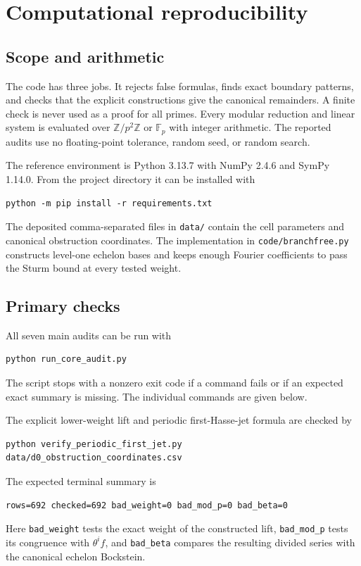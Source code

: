 \section{Computational reproducibility}
\label{app:computational-reproducibility}

\subsection{Scope and arithmetic}

The code has three jobs.  It rejects false formulas, finds exact boundary
patterns, and checks that the explicit constructions give the canonical
remainders.  A finite check is never used as a proof for all primes.  Every
modular reduction and linear system is evaluated over
$\mathbb Z/p^2\mathbb Z$ or $\mathbb F_p$ with integer arithmetic.  The
reported audits use no floating-point tolerance, random seed, or random
search.

The reference environment is Python 3.13.7 with NumPy 2.4.6 and SymPy
1.14.0.  From the project directory it can be installed with
\begin{verbatim}
python -m pip install -r requirements.txt
\end{verbatim}
The deposited comma-separated files in \texttt{data/} contain the cell
parameters and canonical obstruction coordinates.  The implementation in
\texttt{code/branchfree.py} constructs level-one echelon bases and keeps
enough Fourier coefficients to pass the Sturm bound at every tested weight.

\subsection{Primary checks}

All seven main audits can be run with
\begin{verbatim}
python run_core_audit.py
\end{verbatim}
The script stops with a nonzero exit code if a command fails or if an
expected exact summary is missing.  The individual commands are given
below.

The explicit lower-weight lift and periodic first-Hasse-jet formula are
checked by
\begin{verbatim}
python verify_periodic_first_jet.py data/d0_obstruction_coordinates.csv
\end{verbatim}
The expected terminal summary is
\begin{verbatim}
rows=692 checked=692 bad_weight=0 bad_mod_p=0 bad_beta=0
\end{verbatim}
Here \texttt{bad\_weight} tests the exact weight of the constructed lift,
\texttt{bad\_mod\_p} tests its congruence with $\theta^if$, and
\texttt{bad\_beta} compares the resulting divided series with the canonical
echelon Bockstein.

